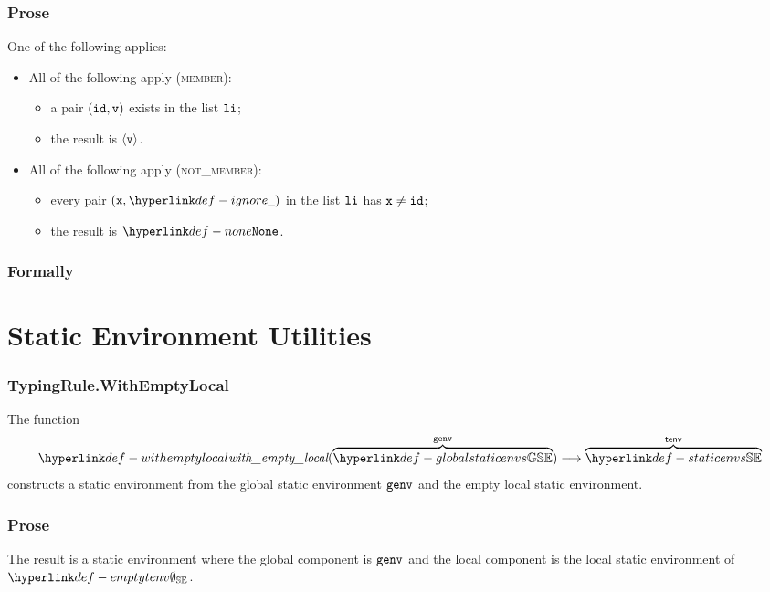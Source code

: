 \subsubsection{Prose}
One of the following applies:
\begin{itemize}
  \item All of the following apply (\textsc{member}):
  \begin{itemize}
    \item a pair $(\texttt{id},\texttt{v})$ exists in the list $\texttt{li}$;
    \item the result is $\langle\texttt{v}\rangle$.
  \end{itemize}

  \item All of the following apply (\textsc{not\_member}):
  \begin{itemize}
    \item every pair $(\vx,\Ignore)$ in the list $\texttt{li}$ has $\texttt{x}\neq\texttt{id}$;
    \item the result is $\None$.
  \end{itemize}
\end{itemize}

\subsubsection{Formally}

\section{Static Environment Utilities}

\hypertarget{def-withemptylocal}{}
\subsubsection{TypingRule.WithEmptyLocal}
The function
\[
  \withemptylocal(\overname{\globalstaticenvs}{\genv})
  \aslto \overname{\staticenvs}{\tenv}
\]
constructs a static environment from the global static environment $\texttt{genv}$
and the empty local static environment.

\subsubsection{Prose}
The result is a static environment where the global component is $\texttt{genv}$ and the local component
is the local static environment of $\emptytenv$.
